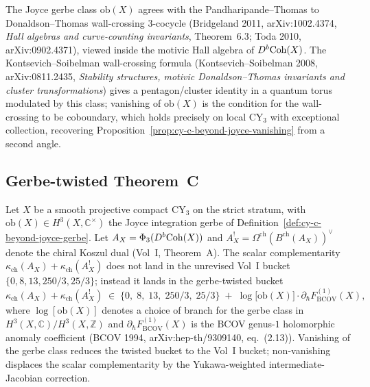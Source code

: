 \begin{remark}
\label{rem:cy-c-beyond-pt-dt-cocycle}
The Joyce gerbe class $\mathrm{ob}(X)$ agrees with the Pandharipande--Thomas to
Donaldson--Thomas wall-crossing 3-cocycle (Bridgeland 2011,
arXiv:1002.4374, \emph{Hall algebras and curve-counting invariants},
Theorem~6.3; Toda 2010, arXiv:0902.4371), viewed inside the motivic Hall
algebra of $D^b\mathrm{Coh}(X)$. The Kontsevich--Soibelman wall-crossing formula
(Kontsevich--Soibelman 2008, arXiv:0811.2435, \emph{Stability structures,
motivic Donaldson--Thomas invariants and cluster transformations}) gives a
pentagon/cluster identity in a quantum torus modulated by this class;
vanishing of $\mathrm{ob}(X)$ is the condition for the wall-crossing to be
coboundary, which holds precisely on local CY$_3$ with exceptional collection,
recovering Proposition~\ref{prop:cy-c-beyond-joyce-vanishing} from a second
angle.
\end{remark}

\subsection{Gerbe-twisted Theorem~C}
\label{subsec:cy-c-beyond-twisted-theoremC}

\begin{conjecture}
\label{thm:cy-c-beyond-twisted-theoremC}
\ClaimStatusConjectured
Let $X$ be a smooth projective compact CY$_3$ on the strict stratum, with
$\mathrm{ob}(X) \in H^3(X, \mathbb{C}^\times)$ the Joyce integration gerbe of
Definition~\ref{def:cy-c-beyond-joyce-gerbe}. Let
$A_X = \Phi_3(D^b\mathrm{Coh}(X))$ and
$A_X^! = \Omega^{\mathrm{ch}}(B^{\mathrm{ch}}(A_X))^\vee$ denote the chiral
Koszul dual (Vol~I, Theorem~A). The scalar complementarity
$\kappa_{\mathrm{ch}}(A_X) + \kappa_{\mathrm{ch}}(A_X^!)$ does not land in the
unrevised Vol~I bucket
$\{0, 8, 13, 250/3, 25/3\}$; instead it lands in the gerbe-twisted bucket
\[
 \kappa_{\mathrm{ch}}(A_X) + \kappa_{\mathrm{ch}}(A_X^!)
 \;\in\;
 \{0,\; 8,\; 13,\; 250/3,\; 25/3\} \;+\; \log \bigl[ \mathrm{ob}(X) \bigr]
 \cdot \partial_{\hbar} F^{(1)}_{\mathrm{BCOV}}(X),
\]
where $\log[\mathrm{ob}(X)]$ denotes a choice of branch for the gerbe class
in $H^3(X, \mathbb{C})/H^3(X, \mathbb{Z})$ and
$\partial_{\hbar} F^{(1)}_{\mathrm{BCOV}}(X)$ is the BCOV genus-$1$ holomorphic
anomaly coefficient (BCOV 1994, arXiv:hep-th/9309140, eq.~(2.13)). Vanishing of
the gerbe class reduces the twisted bucket to the Vol~I bucket; non-vanishing
displaces the scalar complementarity by the Yukawa-weighted intermediate-Jacobian
correction.
\end{conjecture}

